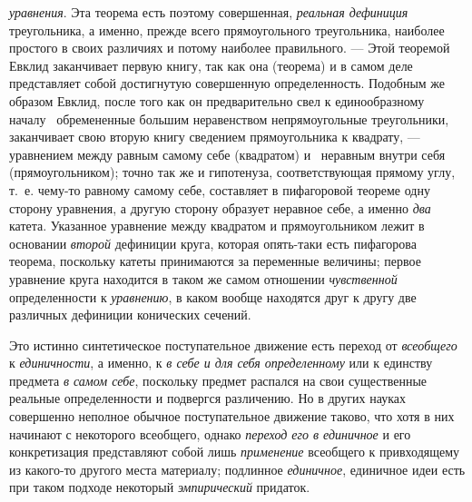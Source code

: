 \documentclass[twoside]{article}
\begin{document}
{\em уравнения}. Эта
теорема есть поэтому совершенная,
{\em реальная дефиниция}
треугольника, а именно, прежде всего прямоугольного
треугольника, наиболее простого в своих различиях и потому наиболее
правильного. — Этой теоремой Евклид заканчивает первую
книгу, так как она (теорема) и в самом деле представляет собой достигнутую
совершенную определенность. Подобным же образом Евклид, после того как он
предварительно свел к единообразному
началу~\label{bkm:bm112}
обремененные большим неравенством непрямоугольные
треугольники, заканчивает свою вторую книгу сведением прямоугольника к
квадрату, — уравнением между равным самому себе (квадратом)
и~\label{bkm:bm113}
неравным внутри себя (прямоугольником); точно так же и
гипотенуза, соответствующая прямому углу, т.~е. чему-то равному самому
себе, составляет в пифагоровой теореме одну сторону уравнения, а другую
сторону образует неравное себе, а именно
{\em два} катета.
Указанное уравнение между квадратом и прямоугольником лежит в основании
{\em второй} дефиниции
круга, которая опять-таки есть пифагорова теорема, поскольку катеты
принимаются за переменные величины; первое уравнение круга находится в
таком же самом отношении
{\em чувственной}
определенности к
{\em уравнению}, в каком
вообще находятся друг к другу две различных дефиниции конических сечений.

Это истинно синтетическое поступательное движение есть переход
от {\em всеобщего} к
{\em единичности}, а
именно, к {\em в себе и для себя
определенному} или к единству предмета
{\em в самом себе},
поскольку предмет распался на свои существенные реальные
определенности и подвергся различению. Но в других науках совершенно
неполное обычное поступательное движение таково, что хотя в них начинают с
некоторого всеобщего, однако
{\em переход его в единичное}
и его конкретизация представляют собой лишь
{\em применение}
всеобщего к привходящему из какого-то другого места
материалу; подлинное {\em единичное},
единичное идеи есть при таком подходе некоторый
{\em эмпирический} придаток.
\end{document}
